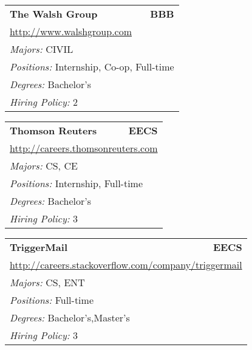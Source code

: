\documentclass[twoside]{article}
\begin{document}
\begin{center}
\begin{multicols}{3}
\begin{FlushLeft}
\begin{minipage}{.9\columnwidth}
\end{minipage}
 
\begin{minipage}{.9\columnwidth}\begin{tabularx}{.95\columnwidth}{Xr}
                 {\Large\bf The Walsh Group} & {\Large\bf BBB}\\
    \multicolumn{2}{p{.95\columnwidth}}{\url{http://www.walshgroup.com}}\\
    \multicolumn{2}{p{.95\columnwidth}}{\emph{Majors:} CIVIL}\\
    \multicolumn{2}{p{.95\columnwidth}}{\emph{Positions:} Internship, Co-op, Full-time}\\
    \multicolumn{2}{p{.95\columnwidth}}{\emph{Degrees:} Bachelor's}\\
    \multicolumn{2}{p{.95\columnwidth}}{\emph{Hiring Policy:} 2}\\
    \end{tabularx}
    
\end{minipage}
 
\begin{minipage}{.9\columnwidth}\begin{tabularx}{.95\columnwidth}{Xr}
                 {\Large\bf Thomson Reuters} & {\Large\bf EECS}\\
    \multicolumn{2}{p{.95\columnwidth}}{\url{http://careers.thomsonreuters.com}}\\
    \multicolumn{2}{p{.95\columnwidth}}{\emph{Majors:} CS, CE}\\
    \multicolumn{2}{p{.95\columnwidth}}{\emph{Positions:} Internship, Full-time}\\
    \multicolumn{2}{p{.95\columnwidth}}{\emph{Degrees:} Bachelor's}\\
    \multicolumn{2}{p{.95\columnwidth}}{\emph{Hiring Policy:} 3}\\
    \end{tabularx}
    
\end{minipage}
 
\begin{minipage}{.9\columnwidth}\begin{tabularx}{.95\columnwidth}{Xr}
                 {\Large\bf TriggerMail} & {\Large\bf EECS}\\
    \multicolumn{2}{p{.95\columnwidth}}{\url{http://careers.stackoverflow.com/company/triggermail}}\\
    \multicolumn{2}{p{.95\columnwidth}}{\emph{Majors:} CS, ENT}\\
    \multicolumn{2}{p{.95\columnwidth}}{\emph{Positions:} Full-time}\\
    \multicolumn{2}{p{.95\columnwidth}}{\emph{Degrees:} Bachelor's,Master's}\\
    \multicolumn{2}{p{.95\columnwidth}}{\emph{Hiring Policy:} 3}\\
    \end{tabularx}
    

\end{minipage}
\end{FlushLeft}
\end{multicols}
\end{center}
\end{document}
